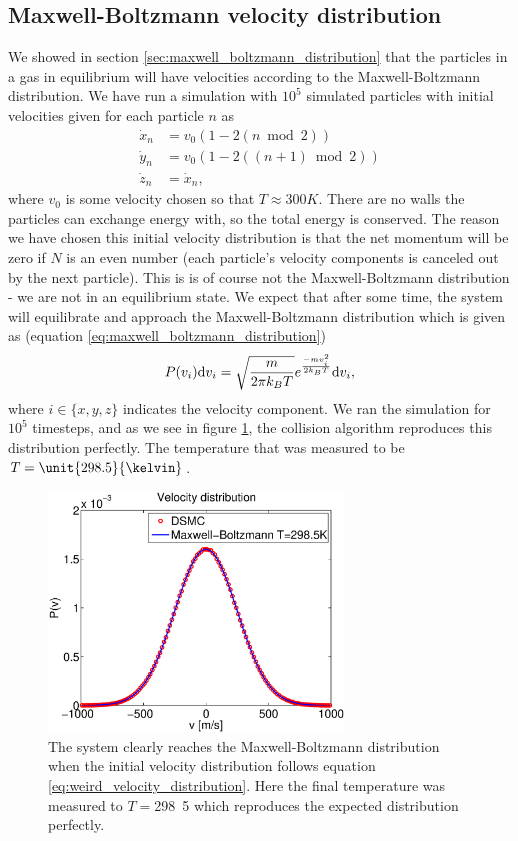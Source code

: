 \subsection{Maxwell-Boltzmann velocity distribution}
We showed in section \ref{sec:maxwell_boltzmann_distribution} that the particles in a gas in equilibrium will have velocities according to the Maxwell-Boltzmann distribution. We have run a simulation with $10^5$ simulated particles with initial velocities given for each particle $n$ as
\begin{align}
	\nonumber
	\dot x_n &= v_0(1 - 2 (n\bmod 2))\\
	\label{eq:weird_velocity_distribution}
	\dot y_n &= v_0(1 - 2 ((n+1)\bmod 2))\\
	\nonumber
	\dot z_n &= \dot x_n,
\end{align}
where $v_0$ is some velocity chosen so that $T\approx 300K$. There are no walls the particles can exchange energy with, so the total energy is conserved. The reason we have chosen this initial velocity distribution is that the net momentum will be zero if $N$ is an even number (each particle's velocity components is canceled out by the next particle). This is is of course not the Maxwell-Boltzmann distribution - we are not in an equilibrium state. We expect that after some time, the system will equilibrate and approach the Maxwell-Boltzmann distribution which is given as (equation \eqref{eq:maxwell_boltzmann_distribution})
\begin{align}
	P(v_i)\mathrm{d}v_i = \sqrt{m\over 2\pi k_BT}e^{-mv_i^2\over 2k_BT}\mathrm{d}v_i,
\end{align}
where $i\in \{x,y,z\}$ indicates the velocity component. We ran the simulation for $10^5$ timesteps, and as we see in figure \ref{fig:velocity_distribution}, the collision algorithm reproduces this distribution perfectly. The temperature that was measured to be $T=\unit{298.5}{\kelvin}$.
\begin{figure}[htb]
\begin{center}
\includegraphics[width=0.7\textwidth, trim=0cm 0cm 0cm 0cm, clip]{DSMC/figures/velocity_distribution.eps}
\end{center}
\caption{The system clearly reaches the Maxwell-Boltzmann distribution when the initial velocity distribution follows equation \ref{eq:weird_velocity_distribution}. Here the final temperature was measured to $T=$\unit{298.5}{\kelvin} which reproduces the expected distribution perfectly.}
\label{fig:velocity_distribution}
\end{figure}

